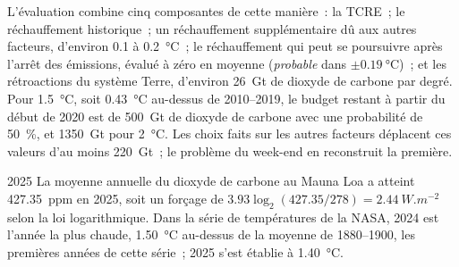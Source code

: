 L'évaluation combine cinq composantes de cette manière~: la TCRE~; le réchauffement historique~; un
réchauffement supplémentaire dû aux autres facteurs, d'environ 0.1 à \qty{0.2}{\celsius}~; le réchauffement
qui peut se poursuivre après l'arrêt des émissions, évalué à zéro en moyenne (\emph{probable} dans $\pm
\qty{0.19}{\celsius}$)~; et les rétroactions du système Terre, d'environ \qty{26}{Gt} de dioxyde de carbone
par degré. Pour \qty{1.5}{\celsius}, soit \qty{0.43}{\celsius} au-dessus de 2010--2019, le budget restant à
partir du début de 2020 est de \qty{500}{Gt} de dioxyde de carbone avec une probabilité de
\qty{50}{\percent}, et \qty{1350}{Gt} pour \qty{2}{\celsius}. Les choix faits sur les autres facteurs
déplacent ces valeurs d'au moins \qty{220}{Gt}~; le problème du week-end en reconstruit la première.

\begin{dated}{2025}
La moyenne annuelle du dioxyde de carbone au Mauna Loa a atteint \qty{427.35}{ppm} en 2025, soit un
forçage de $3.93\log_2(427.35/278) = \qty{2.44}{W.m^{-2}}$ selon la loi logarithmique. Dans la série de
températures de la NASA, 2024 est l'année la plus chaude, \qty{1.50}{\celsius} au-dessus de la moyenne
de 1880--1900, les premières années de cette série~; 2025 s'est établie à \qty{1.40}{\celsius}.
\end{dated}


